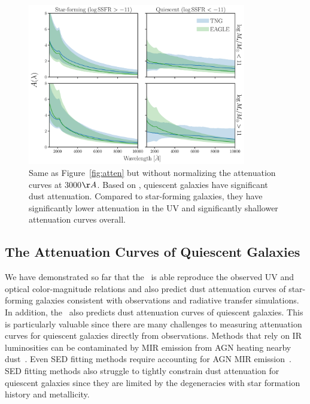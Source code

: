 \begin{figure}
\begin{center}
    \includegraphics[width=0.85\textwidth]{figs/abc_attenuation_unormalized.pdf}
    \caption{\label{fig:raw_atten}
    Same as Figure~\ref{fig:atten} but without normalizing the attenuation
    curves at 3000$\AA$. Based on \eda, quiescent galaxies have significant 
    dust attenuation. Compared to star-forming galaxies, they have 
    significantly lower attenuation in the UV and significantly shallower 
    attenuation curves overall.
    }
\end{center}
\end{figure}
\subsection{The Attenuation Curves of Quiescent Galaxies}  
We have demonstrated so far that the \eda~is able reproduce the observed UV and
optical color-magnitude relations and also predict dust attenuation curves
of star-forming galaxies consistent with observations and radiative transfer 
simulations. In addition, the \eda~also predicts dust attenuation curves of
quiescent galaxies. This is particularly valuable since there are many challenges 
to measuring attenuation curves for quiescent galaxies directly from observations. 
Methods that rely on IR luminosities can be contaminated by MIR emission from AGN
heating nearby dust~\cite{kirkpatrick2015}. Even SED fitting methods require 
accounting for AGN MIR emission~\citep{salim2016, leja2018, salim2018}. SED 
fitting methods also struggle to tightly constrain dust attenuation for quiescent 
galaxies since they are limited by the degeneracies with star formation history and 
metallicity.


